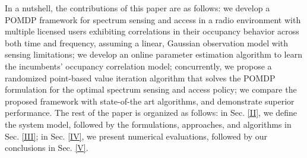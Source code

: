 \documentclass[10pt,twocolumn]{IEEEtran}
\begin{document}
In a nutshell, the contributions of this paper are as follows:
we develop a POMDP framework for spectrum sensing and access in a radio environment with multiple licensed users exhibiting correlations in their occupancy behavior across both time and frequency, assuming a linear, Gaussian observation model with sensing limitations; we develop an online parameter estimation algorithm to learn the incumbents' occupancy correlation model; 
concurrently, we propose a randomized point-based value iteration algorithm that solves the POMDP formulation for the optimal spectrum sensing and access policy; we compare the proposed framework with state-of-the art algorithms, and demonstrate superior performance. The rest of the paper is organized as follows: in Sec. \ref{II}, we define the system model, followed by the formulations, approaches, and algorithms in Sec. \ref{III}; in Sec. \ref{IV}, we present numerical evaluations, followed by our conclusions in Sec. \ref{V}.
\vspace{-4mm}
\end{document}

